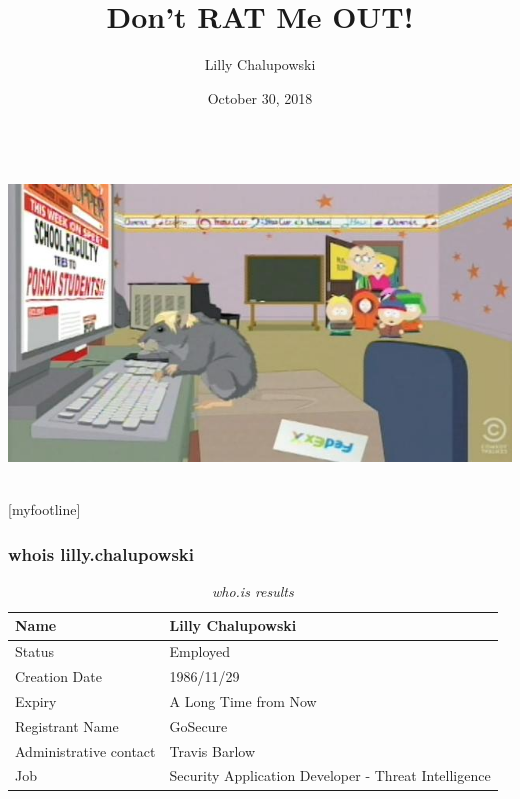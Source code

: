 \documentclass[aspectratio=169]{beamer}
\title{Don't RAT Me OUT!}
\institute{GoSecure}
\author{Lilly Chalupowski}
\date{October 30, 2018}
\begin{document}
\begin{frame}[t]
  \begin{center}
    \begingroup
    \fontsize{20pt}{20pt}\selectfont
    \inserttitle \\
    \endgroup
    \bigskip
    \includegraphics[scale=0.48]{wikileaks} \\
    \bigskip
    \insertauthor \\
    \insertdate
  \end{center}
\end{frame}

[myfootline]

\begin{frame}
  \frametitle{whois lilly.chalupowski}
  \begin{table}
    \caption{\textit{who.is results}}
    \begin{tabularx}{\textwidth}{|X|X|}
      \hline
      Name & Lilly Chalupowski \\
      \hline
      Status & Employed \\
      \hline
      Creation Date & 1986/11/29 \\
      \hline
      Expiry & A Long Time from Now \\
      \hline
      Registrant Name & GoSecure \\
      \hline
      Administrative contact & Travis Barlow \\
      \hline
      Job & Security Application Developer - Threat Intelligence \\
      \hline
    \end{tabularx}
  \end{table}
\end{frame}
\end{document}
